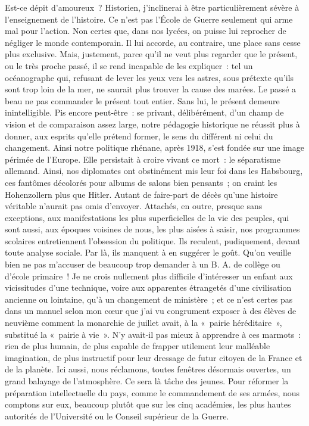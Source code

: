 \documentclass[french,twoside]{book} %
\begin{document}
Est-ce dépit d’amoureux ? Historien, j’inclinerai à être particulièrement sévère à l’enseignement de l’histoire. Ce n’est pas l’École de Guerre seulement qui arme mal pour l’action. Non certes que, dans nos lycées, on puisse lui reprocher de négliger le monde contemporain. Il lui accorde, au contraire, une place sans cesse plus exclusive. Mais, justement, parce qu’il ne veut plus regarder que le présent, ou le très proche passé, il se rend incapable de les expliquer : tel un océanographe qui, refusant de lever les yeux vers les astres, sous prétexte qu’ils sont trop loin de la mer, ne saurait plus trouver la cause des marées. Le passé a beau ne pas commander le présent tout entier. Sans lui, le présent demeure inintelligible. Pis encore peut-être : se privant, délibérément, d’un champ de vision et de comparaison assez large, notre pédagogie historique ne réussit plus à donner, aux esprits qu’elle prétend former, le sens du différent ni celui du changement. Ainsi notre politique rhénane, après 1918, s’est fondée sur une image périmée de l’Europe. Elle persistait à croire vivant ce mort : le séparatisme allemand. Ainsi, nos diplomates ont obstinément mis leur foi dans les Habsbourg, ces fantômes décolorés pour albums de salons bien pensants ; on craint les   Hohenzollern plus que Hitler. Autant de faire-part de décès qu’une histoire véritable n’aurait pas omis d’envoyer. Attachés, en outre, presque sans exceptions, aux manifestations les plus superficielles de la vie des peuples, qui sont aussi, aux époques voisines de nous, les plus aisées à saisir, nos programmes scolaires entretiennent l’obsession du politique. Ils reculent, pudiquement, devant toute analyse sociale. Par là, ils manquent à en suggérer le goût. Qu’on veuille bien ne pas m’accuser de beaucoup trop demander à un B. A. de collège ou d’école primaire ! Je ne crois nullement plus difficile d’intéresser un enfant aux vicissitudes d’une technique, voire aux apparentes étrangetés d’une civilisation ancienne ou lointaine, qu’à un changement de ministère ; et ce n’est certes pas dans un manuel selon mon cœur que j’ai vu congrument exposer à des élèves de neuvième comment la monarchie de juillet avait, à la « pairie héréditaire », substitué la « pairie à vie ». N’y avait-il pas mieux à apprendre à ces marmots : rien de plus humain, de plus capable de frapper utilement leur malléable imagination, de plus instructif pour leur dressage de futur citoyen de la France et de la planète. Ici aussi, nous réclamons, toutes fenêtres désormais ouvertes, un grand balayage de l’atmosphère. Ce sera là tâche des jeunes. Pour réformer la préparation intellectuelle du pays, comme le commandement de ses armées, nous comptons sur eux, beaucoup plutôt que sur les cinq académies, les plus hautes autorités de l’Université ou le Conseil supérieur de la Guerre.\par
\end{document}
